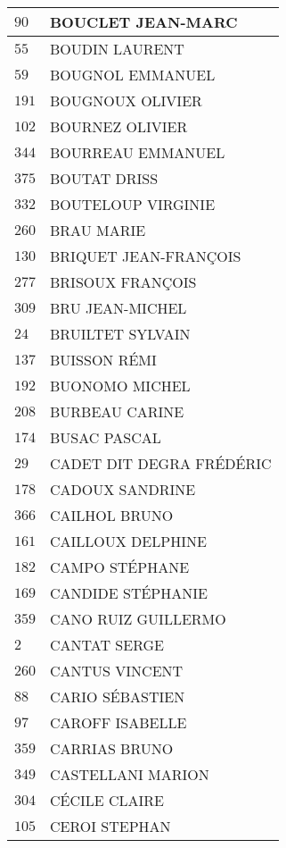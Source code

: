 \begin{xltabular}{\linewidth}{|l|X|}
    $90$ & BOUCLET JEAN-MARC \\
    \hline
    $55$ & BOUDIN LAURENT \\
    \hline
    $59$ & BOUGNOL EMMANUEL \\
    \hline
    $191$ & BOUGNOUX OLIVIER \\
    \hline
    $102$ & BOURNEZ OLIVIER \\
    \hline
    $344$ & BOURREAU EMMANUEL \\
    \hline
    $375$ & BOUTAT DRISS \\
    \hline
    $332$ & BOUTELOUP VIRGINIE \\
    \hline
    $260$ & BRAU MARIE \\
    \hline
    $130$ & BRIQUET JEAN-FRANÇOIS \\
    \hline
    $277$ & BRISOUX FRANÇOIS \\
    \hline
    $309$ & BRU JEAN-MICHEL \\
    \hline
    $24$ & BRUILTET SYLVAIN \\
    \hline
    $137$ & BUISSON RÉMI \\
    \hline
    $192$ & BUONOMO MICHEL \\
    \hline
    $208$ & BURBEAU CARINE \\
    \hline
    $174$ & BUSAC PASCAL \\
    \hline
    $29$ & CADET DIT DEGRA FRÉDÉRIC \\
    \hline
    $178$ & CADOUX SANDRINE \\
    \hline
    $366$ & CAILHOL BRUNO \\
    \hline
    $161$ & CAILLOUX DELPHINE \\
    \hline
    $182$ & CAMPO STÉPHANE \\
    \hline
    $169$ & CANDIDE STÉPHANIE \\
    \hline
    $359$ & CANO RUIZ GUILLERMO \\
    \hline
    $2$ & CANTAT SERGE \\
    \hline
    $260$ & CANTUS VINCENT \\
    \hline
    $88$ & CARIO SÉBASTIEN \\
    \hline
    $97$ & CAROFF ISABELLE \\
    \hline
    $359$ & CARRIAS BRUNO \\
    \hline
    $349$ & CASTELLANI MARION \\
    \hline
    $304$ & CÉCILE CLAIRE \\
    \hline
    $105$ & CEROI STEPHAN \\

\end{xltabular}
